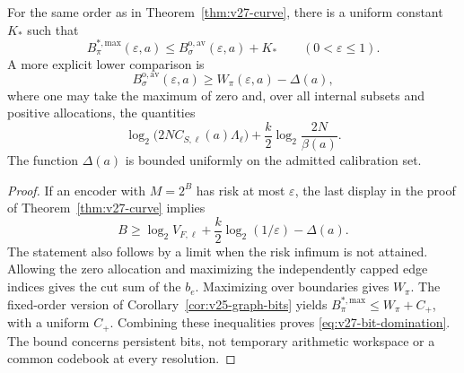 \begin{corollary}\label{cor:v27-bits}
For the same order as in Theorem~\ref{thm:v27-curve}, there is a uniform constant $K_*$ such that
\begin{equation}\label{eq:v27-bit-domination}
 B^{*,\mathrm{max}}_\pi(\varepsilon,a)
 \le B^{\mathrm{o,av}}_\sigma(\varepsilon,a)+K_*
                     \qquad(0<\varepsilon\le1).
\end{equation}
A more explicit lower comparison is
\[
 B^{\mathrm{o,av}}_\sigma(\varepsilon,a)
                         \ge W_\pi(\varepsilon,a)-\Delta(a),
\]
where one may take the maximum of zero and, over all internal subsets and positive allocations, the quantities
\begin{equation}\label{eq:v27-bit-cost}
 \log_2\!\bigl(2N C_{S,\ell}(a)\Lambda_\ell\bigr)
                  +\frac{k}{2}\log_2\!\frac{2N}{\beta(a)}.
\end{equation}
The function $\Delta(a)$ is bounded uniformly on the admitted calibration set.
\end{corollary}
\begin{proof}
If an encoder with $M=2^B$ has risk at most $\varepsilon$, the last display in the proof of Theorem~\ref{thm:v27-curve} implies
\[
 B\ge \log_2V_{F,\ell}
          +\frac{k}{2}\log_2(1/\varepsilon)-\Delta(a).
\]
The statement also follows by a limit when the risk infimum is not attained. Allowing the zero allocation and maximizing the independently capped edge indices gives the cut sum of the $b_e$. Maximizing over boundaries gives $W_\pi$. The fixed-order version of Corollary~\ref{cor:v25-graph-bits} yields $B^{*,\mathrm{max}}_\pi\le W_\pi+C_+$, with a uniform $C_+$. Combining these inequalities proves \eqref{eq:v27-bit-domination}. The bound concerns persistent bits, not temporary arithmetic workspace or a common codebook at every resolution.
\end{proof}

